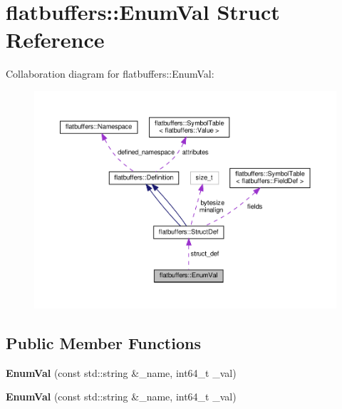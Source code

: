 \hypertarget{structflatbuffers_1_1EnumVal}{}\section{flatbuffers\+:\+:Enum\+Val Struct Reference}
\label{structflatbuffers_1_1EnumVal}


Collaboration diagram for flatbuffers\+:\+:Enum\+Val\+:
\nopagebreak
\begin{figure}[H]
\begin{center}
\leavevmode
\includegraphics[width=350pt]{structflatbuffers_1_1EnumVal__coll__graph}
\end{center}
\end{figure}
\subsection*{Public Member Functions}
\begin{DoxyCompactItemize}
\item 
\mbox{\label{structflatbuffers_1_1EnumVal_a42daab2fe2f039f7fe70295eeece93e5}} 
{\bfseries Enum\+Val} (const std\+::string \&\+\_\+name, int64\+\_\+t \+\_\+val)
\item 
\mbox{\label{structflatbuffers_1_1EnumVal_a42daab2fe2f039f7fe70295eeece93e5}} 
{\bfseries Enum\+Val} (const std\+::string \&\+\_\+name, int64\+\_\+t \+\_\+val)
\end{DoxyCompactItemize}
